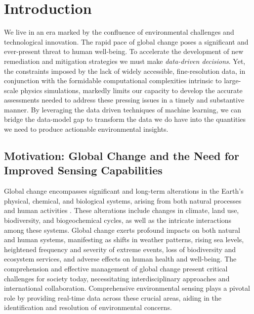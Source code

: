 \chapter{Introduction}

We live in an era marked by the confluence of environmental challenges and technological innovation. The rapid pace of global change poses a significant and ever-present threat to human well-being. To accelerate the development of new remediation and mitigation strategies we must make \textit{data-driven decisions}. Yet, the constraints imposed by the lack of widely accessible, fine-resolution data, in conjunction with the formidable computational complexities intrinsic to large-scale physics simulations, markedly limits our capacity to develop the accurate assessments needed to address these pressing issues in a timely and substantive manner. By leveraging the data driven techniques of machine learning, we can bridge the data-model gap to transform the data we do have into the quantities we need to produce actionable environmental insights.

\section{Motivation: Global Change and the Need for Improved Sensing Capabilities}

Global change encompasses significant and long-term alterations in the Earth's physical, chemical, and biological systems, arising from both natural processes and human activities \cite{IPCC2014, IPCC2018, UN2015}. These alterations include changes in climate, land use, biodiversity, and biogeochemical cycles, as well as the intricate interactions among these systems. Global change exerts profound impacts on both natural and human systems, manifesting as shifts in weather patterns, rising sea levels, heightened frequency and severity of extreme events, loss of biodiversity and ecosystem services, and adverse effects on human health and well-being. The comprehension and effective management of global change present critical challenges for society today, necessitating interdisciplinary approaches and international collaboration. Comprehensive environmental sensing plays a pivotal role by providing real-time data across these crucial areas, aiding in the identification and resolution of environmental concerns.

